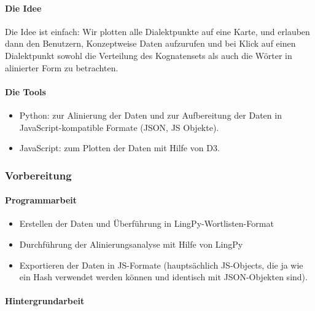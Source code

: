 \paragraph{Die Idee}

Die Idee ist einfach: Wir plotten alle Dialektpunkte auf eine Karte, und
erlauben dann den Benutzern, Konzeptweise Daten aufzurufen und bei Klick
auf einen Dialektpunkt sowohl die Verteilung des Kognatensets als auch
die Wörter in alinierter Form zu betrachten.



\paragraph{Die Tools}

\begin{itemize}
\itemsep1pt\parskip0pt
\item
  Python: zur Alinierung der Daten und zur Aufbereitung der Daten in
  JavaScript-kompatible Formate (JSON, JS Objekte).
\item
  JavaScript: zum Plotten der Daten mit Hilfe von D3.
\end{itemize}


\subsubsection{\texorpdfstring{{Vorbereitung}}{Vorbereitung}}

\paragraph{Programmarbeit}

\begin{itemize}
\itemsep1pt\parskip0pt
\item
  Erstellen der Daten und Überführung in LingPy-Wortlisten-Format
\item
  Durchführung der Alinierungsanalyse mit Hilfe von LingPy
\item
  Exportieren der Daten in JS-Formate (hauptsächlich JS-Objects, die ja
  wie ein Hash verwendet werden können und identisch mit JSON-Objekten
  sind).
\end{itemize}



\paragraph{Hintergrundarbeit}

